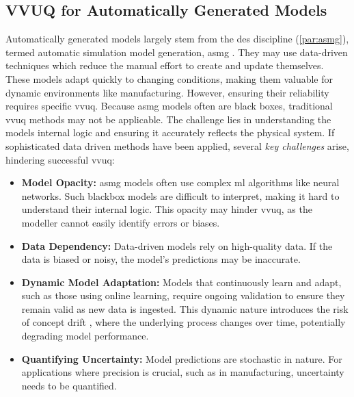 \subsection{VVUQ for Automatically Generated Models}
\label{sec:requirements-automatically-generated-models}
Automatically generated models largely stem from the \gls{des} discipline (\autoref{par:asmg}), termed automatic simulation model generation, \gls{asmg} \autocite{mildeautomated,Charpentier2014}. They may use data-driven techniques which reduce the manual effort to create and update themselves. These models adapt quickly to changing conditions, making them valuable for dynamic environments like manufacturing. However, ensuring their reliability requires specific \gls{vvuq}. Because \gls{asmg} models often are black boxes, traditional \gls{vvuq} methods may not be applicable. The challenge lies in understanding the models internal logic and ensuring it accurately reflects the physical system. If sophisticated data driven methods have been applied, several \textit{key challenges} arise, hindering successful \gls{vvuq}:

\begin{itemize}
    \item \textbf{Model Opacity:} \gls{asmg} models often use complex \gls{ml} algorithms like neural networks. Such blackbox models are difficult to interpret, making it hard to understand their internal logic. This opacity may hinder \gls{vvuq}, as the modeller cannot easily identify errors or biases.
    \item \textbf{Data Dependency:} Data-driven models rely on high-quality data. If the data is biased or noisy, the model's predictions may be inaccurate.
    \item \textbf{Dynamic Model Adaptation:} Models that continuously learn and adapt, such as those using online learning, require ongoing validation to ensure they remain valid as new data is ingested. This dynamic nature introduces the risk of concept drift \autocite{lu2018learning}, where the underlying process changes over time, potentially degrading model performance.
    \item \textbf{Quantifying Uncertainty:} Model predictions are stochastic in nature. For applications where precision is crucial, such as in manufacturing, uncertainty needs to be quantified.
\end{itemize}

